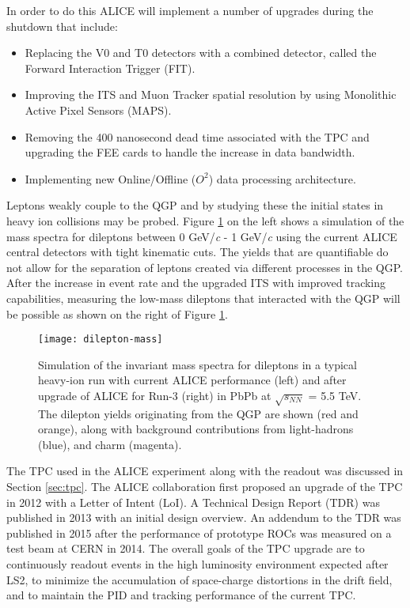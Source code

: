 \noindent
In order to do this ALICE will implement a number of upgrades \cite{1742-6596-589-1-012014} during the shutdown that include:

\begin{itemize}
\item Replacing the V0 and T0 detectors with a combined detector, called the Forward Interaction Trigger (FIT)\cite{1742-6596-798-1-012186}.
\item Improving the ITS and Muon Tracker spatial resolution by using  Monolithic Active Pixel Sensors (MAPS)\cite{Abelev:1625842}\cite{CERN-LHCC-2015-001}.
\item Removing the 400 nanosecond dead time associated with the TPC and upgrading the FEE cards to handle the increase in data bandwidth\cite{Abelev:1475243}.
\item Implementing new Online/Offline ($O^{2}$) data processing architecture\cite{Buncic:2011297}.
\end{itemize}

Leptons weakly couple to the QGP\cite{Ryblewski:2015sha} and by studying these the initial states in heavy ion collisions may be probed\cite{Mauricio:2007vz}.  Figure \ref{fig:lowmassdilep} on the left shows a simulation of the mass spectra for dileptons between 0 GeV/\textit{c} - 1 GeV/\textit{c} using the current ALICE central detectors with tight kinematic cuts.  The yields that are quantifiable do not allow for the separation of leptons created via different processes in the QGP.  After the increase in event rate and the upgraded ITS with improved tracking capabilities, measuring the low-mass dileptons that interacted with the QGP will be possible as shown on the right of Figure \ref{fig:lowmassdilep}. 

\begin{figure}[h]
\texttt{[image: dilepton-mass]}
\centering
\caption{Simulation of the invariant  mass spectra for dileptons in a typical heavy-ion run with current ALICE performance (left) and after upgrade of ALICE for Run-3 (right) in PbPb at $\sqrt{s_{NN}}$ = 5.5 TeV.  The dilepton yields originating from the QGP are shown (red and orange), along with background contributions from light-hadrons (blue), and charm (magenta)\cite{Abelev:1475243}.}
\label{fig:lowmassdilep}
\end{figure}


The TPC used in the ALICE experiment along with the readout was discussed in Section \ref{sec:tpc}.  The ALICE collaboration first proposed an upgrade of the TPC in 2012 with a Letter of Intent (LoI)\cite{Abelev:1475243}.  A Technical Design Report (TDR)\cite{CERN-LHCC-2013-020} was published in 2013 with an initial design overview.  An addendum to the TDR\cite{CERN-LHCC-2015-002} was published in 2015 after the performance of prototype ROCs was measured on a test beam at CERN in 2014.  The overall goals of the TPC upgrade are to continuously readout events in the high luminosity environment expected after LS2, to minimize the accumulation of space-charge distortions in the drift field, and to maintain the PID and tracking performance of the current TPC.


